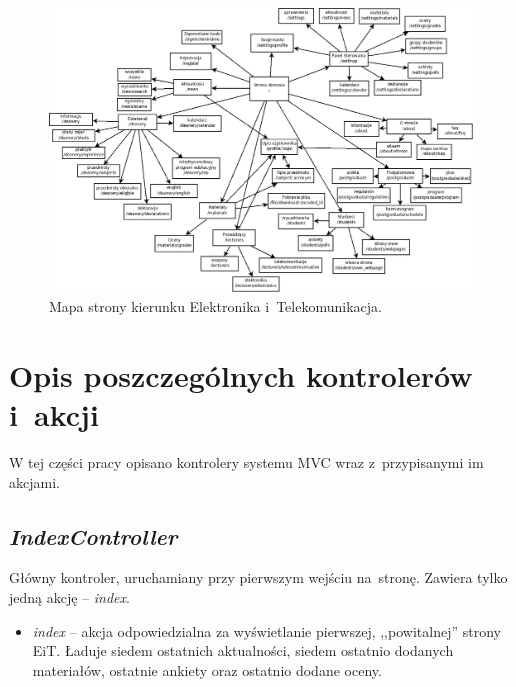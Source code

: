 \documentclass[a4paper,12pt,oneside]{report}
\begin{document}
\newpage
\thispagestyle{empty}
\addtolength{\textwidth}{4cm}
\addtolength{\hoffset}{-2.5cm}
\addtolength{\textheight}{5cm}
\addtolength{\voffset}{-3.5cm}
\begin{landscape}
\begin{figure}
\centering
  \includegraphics{mapa_eit.png}
  \caption{
  Mapa strony kierunku Elektronika i~Telekomunikacja.
  \label{fig:eitmap}
  }
\end{figure}
\end{landscape}
\newpage
\addtolength{\textwidth}{-4cm}
\addtolength{\hoffset}{2.5cm}
\addtolength{\textheight}{-5cm}
\addtolength{\voffset}{3.5cm}



\section{Opis poszczególnych kontrolerów i~akcji}
\label{sec:kontrolery}

W tej części pracy opisano kontrolery systemu MVC wraz z~przypisanymi im akcjami.

\subsection{\emph{IndexController}}
\label{con:index}
  Główny kontroler, uruchamiany przy pierwszym wejściu na~stronę. Zawiera tylko jedną akcję -- \emph{index}.
\begin{itemize}
  \item \emph{index} -- akcja odpowiedzialna za wyświetlanie pierwszej, ,,powitalnej'' strony EiT. Ładuje siedem ostatnich aktualności, siedem ostatnio dodanych materiałów, ostatnie ankiety oraz ostatnio dodane oceny. 
\end{itemize}
\end{document}
